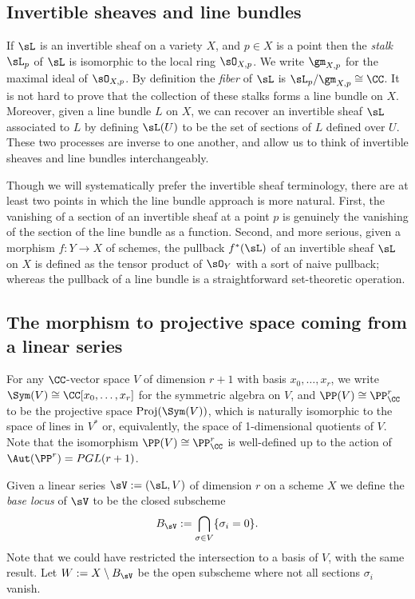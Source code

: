 \subsection{Invertible sheaves and line bundles}

If $\sL$ is an invertible sheaf on a variety $X$, and $p\in X$ is a point then the \emph{stalk} $\sL_p$ of $\sL$ is isomorphic to the local
ring $\sO_{X,p}$. We write $\gm_{X,p}$ for the maximal ideal of $\sO_{X,p}$. By definition the \emph{fiber} of $\sL$ is 
$\sL_p/\gm_{X,p}\cong \CC$. It is not hard to prove that the collection of these stalks forms a line bundle on $X$. Moreover,
given a line bundle $L$ on $X$, we can recover an invertible sheaf $\sL$ associated to $L$ by defining
$\sL(U)$ to be the set of sections of $L$ defined over $U$. These two processes are inverse to one another, and allow
us to think of invertible sheaves and line bundles interchangeably.

Though we will systematically prefer the invertible sheaf terminology, there are at least two points in which the line bundle approach is more natural. First,  the vanishing of a section of an invertible sheaf at a point $p$ is genuinely the vanishing of the 
section of the line bundle as a function. Second, and more serious, given a morphism $f: Y\to X$ of schemes, the 
pullback $f^*(\sL)$ of an invertible sheaf $\sL$ on $X$ is defined as the tensor product of $\sO_Y$ with a sort of naive pullback; whereas the pullback of a line bundle is a straightforward set-theoretic operation.


\subsection{The morphism to projective space coming from a linear series} \label{morphism from series}
For any $\CC$-vector space $V$ of dimension $r+1$ with basis $x_{0}, \dots, x_{r}$, we write $\Sym(V) \cong \CC[x_{0},\dots, x_{r}]$ for the symmetric algebra on $V$, and
$\PP(V)\cong \PP^{r}_{\CC}$ to be the projective space ${\rm Proj}(\Sym(V))$, which is naturally isomorphic to the
space of lines in $V^{*}$ or, equivalently,  the space of 1-dimensional quotients of $V$. Note that the isomorphism $\PP(V)\cong \PP^{r}_{\CC}$ is well-defined up to the action
of $\Aut(\PP^r) = PGL(r+1)$.

Given a linear series $\sV:=(\sL, V)$  of dimension $r$ on a scheme $X$
we define the \emph{base locus} of $\sV$ to be the closed subscheme 
$$
B_\sV := \bigcap_{\sigma\in V}\{\sigma_{i} = 0\}.
$$
Note that we could have restricted the intersection to a basis of $V$, with the same result.
Let $W:=X\setminus B_\sV$ be the open subscheme where not all sections $\sigma_{i}$ vanish.

